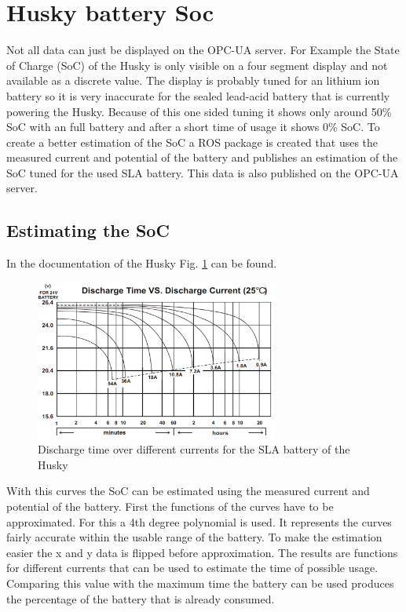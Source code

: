 \documentclass[conference]{IEEEtran}
\begin{document}
\section{Husky battery Soc}
Not all data can just be displayed on the OPC-UA server.
For Example the State of Charge (SoC) of the Husky is only visible on a four segment display and not available as a discrete value.
The display is probably tuned for an lithium ion battery so it is very inaccurate for the sealed lead-acid battery that is currently powering the Husky.
Because of this one sided tuning it shows only around 50\% SoC with an full battery and after a short time of usage it shows 0\% SoC.
To create a better estimation of the SoC a ROS package is created that uses the measured current and potential of the battery and publishes an estimation of the SoC tuned for the used SLA battery.
This data is also published on the OPC-UA server.
\subsection{Estimating the SoC}
In the documentation of the Husky Fig. \ref{fig:EndladekuvenSLA} can be found.
\begin{figure}[htbp]
    \centerline{\includegraphics[width=8cm]{Pictures/EndladekuvenSLA.png}}
    \caption{Discharge time over different currents for the SLA battery of the Husky \cite[p.21]{SLAKurven}}
    \label{fig:EndladekuvenSLA}
\end{figure}
With this curves the SoC can be estimated using the measured current and potential of the battery.
First the functions of the curves have to be approximated. For this a 4th degree polynomial is used.
It represents the curves fairly accurate within the usable range of the battery.
To make the estimation easier the x and y data is flipped before approximation.
The results are functions for different currents that can be used to estimate the time of possible usage.
Comparing this value with the maximum time the battery can be used produces the percentage of the battery that is already consumed.
\end{document}
